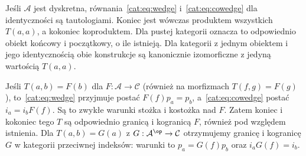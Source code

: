 \begin{przyklad}\label{cat:ex:end-discrete}
Jeśli $\mathcal A$ jest dyskretna, równania~\eqref{cat:eq:wedge} i~\eqref{cat:eq:cowedge} dla identyczności są tautologiami. Koniec jest wówczas produktem wszystkich $T(a,a)$, a kokoniec koproduktem. Dla pustej kategorii oznacza to odpowiednio obiekt końcowy i początkowy, o ile istnieją. Dla kategorii z jednym obiektem i jego identycznością obie konstrukcje są kanonicznie izomorficzne z jedyną wartością $T(a,a)$.
\end{przyklad}
\begin{przyklad}\label{cat:ex:end-one-variable}
Jeśli $T(a,b)=F(b)$ dla $F:\mathcal A\to\mathcal C$ (również na morfizmach $T(f,g)=F(g)$), to~\eqref{cat:eq:wedge} przyjmuje postać $F(f)p_a=p_b$, a~\eqref{cat:eq:cowedge} postać $i_a=i_b F(f)$. Są to zwykłe warunki stożka i kostożka nad $F$. Zatem koniec i kokoniec tego $T$ są odpowiednio granicą i kogranicą $F$, również pod względem istnienia. Dla $T(a,b)=G(a)$ z $G:\mathcal A^{\op}\to\mathcal C$ otrzymujemy granicę i kogranicę $G$ w kategorii przeciwnej indeksów: warunki to $p_a=G(f)p_b$ oraz $i_a G(f)=i_b$.
\end{przyklad}

